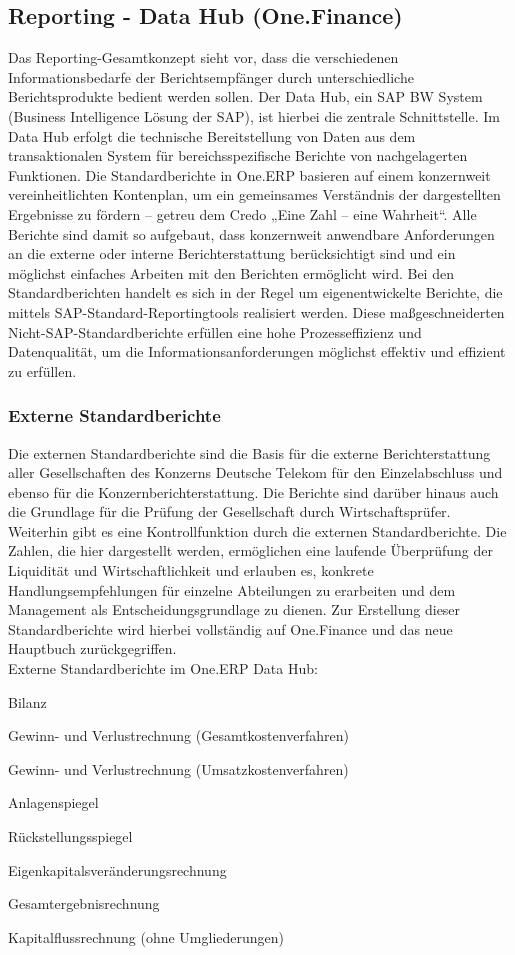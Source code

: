 \subsection{Reporting - Data Hub (One.Finance)}
Das Reporting-Gesamtkonzept sieht vor, dass die verschiedenen Informationsbedarfe der Berichtsempfänger durch unterschiedliche Berichtsprodukte bedient werden sollen. 
Der Data Hub, ein SAP BW System (Business Intelligence Lösung der SAP), ist hierbei die zentrale Schnittstelle. Im Data Hub erfolgt die technische Bereitstellung von Daten aus dem transaktionalen System für bereichsspezifische Berichte von nachgelagerten Funktionen.
Die Standardberichte in One.ERP basieren auf einem konzernweit vereinheitlichten Kontenplan, um ein gemeinsames Verständnis der dargestellten Ergebnisse zu fördern -- getreu dem Credo „Eine Zahl -- eine Wahrheit“. Alle Berichte sind damit so aufgebaut, dass konzernweit anwendbare Anforderungen an die externe oder interne Berichterstattung berücksichtigt sind und ein möglichst einfaches Arbeiten mit den Berichten ermöglicht wird. 
Bei den Standardberichten handelt es sich in der Regel um eigenentwickelte Berichte, die mittels SAP-Standard-Reportingtools realisiert werden. Diese maßgeschneiderten Nicht-SAP-Standardberichte erfüllen eine hohe Prozesseffizienz und Datenqualität, um die Informationsanforderungen möglichst effektiv und effizient zu erfüllen.
\subsubsection{Externe Standardberichte}
Die externen Standardberichte sind die Basis für die externe Berichterstattung aller Gesellschaften des Konzerns Deutsche Telekom für den Einzelabschluss und ebenso für die Konzernberichterstattung. Die Berichte sind darüber hinaus auch die Grundlage für die Prüfung der Gesellschaft durch Wirtschaftsprüfer. 
Weiterhin gibt es eine Kontrollfunktion durch die externen Standardberichte. Die Zahlen, die hier dargestellt werden, ermöglichen eine laufende Überprüfung der Liquidität und Wirtschaftlichkeit und erlauben es, konkrete Handlungsempfehlungen für einzelne Abteilungen zu erarbeiten und dem Management als Entscheidungsgrundlage zu dienen. Zur Erstellung dieser Standardberichte wird hierbei vollständig auf One.Finance und das neue Hauptbuch zurückgegriffen. \\
Externe Standardberichte im One.ERP Data Hub:
\begin{compactitem}  
\item 	  Bilanz
\item     Gewinn- und Verlustrechnung (Gesamtkostenverfahren)
\item     Gewinn- und Verlustrechnung (Umsatzkostenverfahren)
\item     Anlagenspiegel
\item    Rückstellungsspiegel
 \item    Eigenkapitalsveränderungsrechnung
\item     Gesamtergebnisrechnung
 \item    Kapitalflussrechnung (ohne Umgliederungen)
\end{compactitem}
